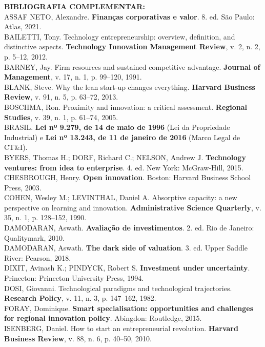 \documentclass[11pt,a4paper]{article}
\begin{document}
\begin{flushleft}
\noindent\textbf{BIBLIOGRAFIA COMPLEMENTAR:}\\[4pt]
ASSAF NETO, Alexandre. \textbf{Finanças corporativas e valor}. 8. ed. São Paulo: Atlas, 2021.\\[3pt]
BAILETTI, Tony. Technology entrepreneurship: overview, definition, and distinctive aspects. \textbf{Technology Innovation Management Review}, v. 2, n. 2, p. 5--12, 2012.\\[3pt]
BARNEY, Jay. Firm resources and sustained competitive advantage. \textbf{Journal of Management}, v. 17, n. 1, p. 99--120, 1991.\\[3pt]
BLANK, Steve. Why the lean start-up changes everything. \textbf{Harvard Business Review}, v. 91, n. 5, p. 63--72, 2013.\\[3pt]
BOSCHMA, Ron. Proximity and innovation: a critical assessment. \textbf{Regional Studies}, v. 39, n. 1, p. 61--74, 2005.\\[3pt]
BRASIL. \textbf{Lei nº 9.279, de 14 de maio de 1996} (Lei da Propriedade Industrial) e \textbf{Lei nº 13.243, de 11 de janeiro de 2016} (Marco Legal de CT\&I).\\[3pt]
BYERS, Thomas H.; DORF, Richard C.; NELSON, Andrew J. \textbf{Technology ventures: from idea to enterprise}. 4. ed. New York: McGraw-Hill, 2015.\\[3pt]
CHESBROUGH, Henry. \textbf{Open innovation}. Boston: Harvard Business School Press, 2003.\\[3pt]
COHEN, Wesley M.; LEVINTHAL, Daniel A. Absorptive capacity: a new perspective on learning and innovation. \textbf{Administrative Science Quarterly}, v. 35, n. 1, p. 128--152, 1990.\\[3pt]
DAMODARAN, Aswath. \textbf{Avaliação de investimentos}. 2. ed. Rio de Janeiro: Qualitymark, 2010.\\[3pt]
DAMODARAN, Aswath. \textbf{The dark side of valuation}. 3. ed. Upper Saddle River: Pearson, 2018.\\[3pt]
DIXIT, Avinash K.; PINDYCK, Robert S. \textbf{Investment under uncertainty}. Princeton: Princeton University Press, 1994.\\[3pt]
DOSI, Giovanni. Technological paradigms and technological trajectories. \textbf{Research Policy}, v. 11, n. 3, p. 147--162, 1982.\\[3pt]
FORAY, Dominique. \textbf{Smart specialisation: opportunities and challenges for regional innovation policy}. Abingdon: Routledge, 2015.\\[3pt]
ISENBERG, Daniel. How to start an entrepreneurial revolution. \textbf{Harvard Business Review}, v. 88, n. 6, p. 40--50, 2010.\\[3pt]

\end{flushleft}
\end{document}

